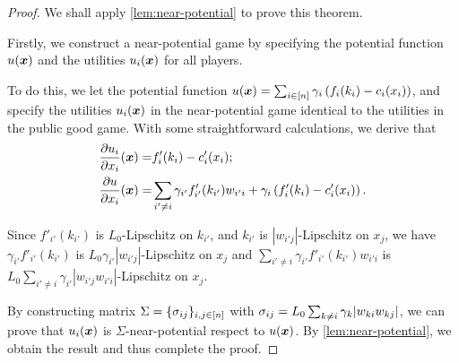 \begin{proof}
\label{prf:thm:NE:unique:near-individual}
We shall apply \cref{lem:near-potential} to prove this theorem.

Firstly, we construct a near-potential game by  specifying the potential function $u({\bm{x}})$ and the utilities $u_i({\bm{x}})$ for all players.

To do this, we let the potential function $u({\bm{x}}) = \sum_{i\in[n]} \gamma_i \left( f_i(k_i) - c_i(x_i) \right)$, and specify the utilities $u_i({\bm{x}})$ in the near-potential game identical to the utilities in the public good game. With some straightforward calculations, we derive that
\begin{align*}
    \frac{\partial u_i}{\partial x_i}({\bm{x}}) =& f'_i(k_i) - c'_i(x_i);
    \\
    \frac{\partial u}{\partial x_i}({\bm{x}}) =& \sum_{i' \ne i} \gamma_{i'} f'_{i'}(k_{i'})w_{i'i} + \gamma_i \left( f'_i(k_i) - c'_i(x_i) \right).
\end{align*}

Since $f'_{i'}(k_{i'})$ is $L_0$-Lipschitz on $k_{i'}$, and $k_{i'}$ is $|w_{i'j}|$-Lipschitz on $x_j$, we have $\gamma_{i'} f'_{i'}(k_{i'})$ is $L_0 \gamma_{i'} |w_{i'j}|$-Lipschitz on $x_j$ and $\sum_{i'\ne i} \gamma_{i'} f'_{i'}(k_{i'}) w_{i'i}$ is $ L_0 \sum_{i'\ne i} \gamma_{i'} |w_{i'j} w_{i'i}|$-Lipschitz on $x_j$.

By constructing matrix $\Sigma = \{\sigma_{ij}\}_{i,j\in[n]}$ with $\sigma_{ij} = L_0 \sum_{k\ne i} \gamma_k |w_{ki} w_{kj}|$, we can prove that $u_i({\bm{x}})$ is $\Sigma$-near-potential respect to $u({\bm{x}})$.
By \cref{lem:near-potential}, we obtain the result and thus complete the proof.
\end{proof}